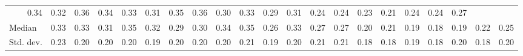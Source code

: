 \begin{tabular}{lllllllllllllllllllll}
  \multicolumn{1}{r}{0.34} &
  \multicolumn{1}{r}{0.32} &
  \multicolumn{1}{r}{0.36} &
  \multicolumn{1}{r}{0.34} &
  \multicolumn{1}{r}{0.33} &
  \multicolumn{1}{r}{0.31} &
  \multicolumn{1}{r}{0.35} &
  \multicolumn{1}{r}{0.36} &
  \multicolumn{1}{r}{0.30} &
  \multicolumn{1}{r}{0.33} &
  \multicolumn{1}{r}{0.29} &
  \multicolumn{1}{r}{0.31} &
  \multicolumn{1}{r}{0.24} &
  \multicolumn{1}{r}{0.24} &
  \multicolumn{1}{r}{0.23} &
  \multicolumn{1}{r}{0.21} &
  \multicolumn{1}{r}{0.24} &
  \multicolumn{1}{r}{0.24} &
  \multicolumn{1}{r}{0.27} \\
\multicolumn{1}{l}{\hspace{2em}Median} &
  \multicolumn{1}{|r}{0.33} &
  \multicolumn{1}{r}{0.33} &
  \multicolumn{1}{r}{0.31} &
  \multicolumn{1}{r}{0.35} &
  \multicolumn{1}{r}{0.32} &
  \multicolumn{1}{r}{0.29} &
  \multicolumn{1}{r}{0.30} &
  \multicolumn{1}{r}{0.34} &
  \multicolumn{1}{r}{0.35} &
  \multicolumn{1}{r}{0.26} &
  \multicolumn{1}{r}{0.33} &
  \multicolumn{1}{r}{0.27} &
  \multicolumn{1}{r}{0.27} &
  \multicolumn{1}{r}{0.20} &
  \multicolumn{1}{r}{0.21} &
  \multicolumn{1}{r}{0.19} &
  \multicolumn{1}{r}{0.18} &
  \multicolumn{1}{r}{0.19} &
  \multicolumn{1}{r}{0.22} &
  \multicolumn{1}{r}{0.25} \\
\multicolumn{1}{l}{\hspace{2em}Std. dev.} &
  \multicolumn{1}{|r}{0.23} &
  \multicolumn{1}{r}{0.20} &
  \multicolumn{1}{r}{0.20} &
  \multicolumn{1}{r}{0.20} &
  \multicolumn{1}{r}{0.19} &
  \multicolumn{1}{r}{0.20} &
  \multicolumn{1}{r}{0.20} &
  \multicolumn{1}{r}{0.20} &
  \multicolumn{1}{r}{0.21} &
  \multicolumn{1}{r}{0.19} &
  \multicolumn{1}{r}{0.20} &
  \multicolumn{1}{r}{0.21} &
  \multicolumn{1}{r}{0.21} &
  \multicolumn{1}{r}{0.18} &
  \multicolumn{1}{r}{0.18} &
  \multicolumn{1}{r}{0.19} &
  \multicolumn{1}{r}{0.18} &
  \multicolumn{1}{r}{0.20} &
  \multicolumn{1}{r}{0.18} &
  \multicolumn{1}{r}{0.20} \\
\cline{1-21}
\end{tabular}
